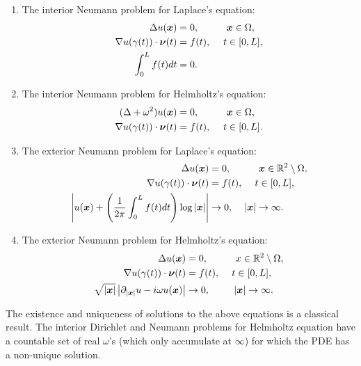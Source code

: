 \begin{enumerate}
\item The interior Neumann problem for Laplace's equation:
\begin{align}\label{eqn:BVPINL}
\Delta u(\boldsymbol{x}) &= 0, \hspace{1 cm} \boldsymbol{x} \in \Omega,\\
\nabla u(\gamma(t))\cdot \boldsymbol{\nu}(t)  &= f(t), \hspace{0.45 cm} t\in [0,L],\\
\int_{0}^{L} f(t) dt &= 0.
\end{align}

\item The interior Neumann problem for Helmholtz's equation:
\begin{align}\label{eqn:BVPINH}
(\Delta + \omega^2) u(\boldsymbol{x}) &= 0, \hspace{1 cm} \boldsymbol{x} \in \Omega,\\
\nabla u(\gamma(t))\cdot \boldsymbol{\nu}(t)  &= f(t), \hspace{0.45 cm} t\in [0,L].
\end{align}

\item The exterior Neumann problem for Laplace's equation:
\begin{align}\label{eqn:BVPEDL}
\Delta u(\boldsymbol{x}) &= 0, \hspace{1 cm} \boldsymbol{x} \in \mathbb{R}^2\setminus\Omega,\\
\nabla u(\gamma(t))\cdot \boldsymbol{\nu}(t)  &= f(t), \hspace{0.43 cm} t \in[0,L], \\
\left|u(\boldsymbol{x}) + \left(\frac{1}{2\pi} \int_{0}^{L} f(t) dt\right) \log{|\boldsymbol{x}|}\right| &\to 0 , \hspace{0.4cm} |\boldsymbol{x}| \to \infty.
\end{align}

\item The exterior Neumann problem for Helmholtz's equation:
\begin{align}\label{eqn:BVPEDH}
\Delta u(\boldsymbol{x}) &= 0, \hspace{1 cm} x \in \mathbb{R}^2\setminus\Omega,\\
\nabla u(\gamma(t))\cdot \boldsymbol{\nu}(t)  &= f(t), \hspace{0.43 cm} t \in[0,L], \\
\sqrt{|\boldsymbol{x}|} \left|\partial_{|\boldsymbol{x}|} u - i\omega u(\boldsymbol{x})\right| &\to 0 , \hspace{0.86cm} |\boldsymbol{x}| \to \infty.
\end{align}

\end{enumerate}

\begin{remark}
The existence and uniqueness of solutions to the above equations is a classical result. 
The interior Dirichlet and Neumann problems for Helmholtz equation have a countable set of
real $\omega$'s (which only accumulate at $\infty$)  for which the PDE has a non-unique solution. 
\end{remark}
